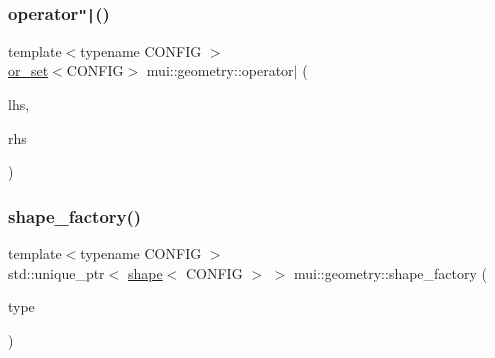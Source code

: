 \mbox{\label{namespacemui_1_1geometry_aa280a571c409841cd8e7ecb1774fd266}} 
\subsubsection{\texorpdfstring{operator\texttt{"|}()}{operator|()}}
{\footnotesize\ttfamily template$<$typename C\+O\+N\+F\+IG $>$ \\
\hyperlink{classmui_1_1geometry_1_1or__set}{or\+\_\+set}$<$C\+O\+N\+F\+IG$>$ mui\+::geometry\+::operator$\vert$ (\begin{DoxyParamCaption}\item[{\hyperlink{classmui_1_1geometry_1_1any__shape}{any\+\_\+shape}$<$ C\+O\+N\+F\+IG $>$}]{lhs,  }\item[{\hyperlink{classmui_1_1geometry_1_1any__shape}{any\+\_\+shape}$<$ C\+O\+N\+F\+IG $>$}]{rhs }\end{DoxyParamCaption})}

\mbox{\label{namespacemui_1_1geometry_a48a53be187267ec9912fafc182651a6e}} 
\subsubsection{\texorpdfstring{shape\+\_\+factory()}{shape\_factory()}}
{\footnotesize\ttfamily template$<$typename C\+O\+N\+F\+IG $>$ \\
std\+::unique\+\_\+ptr$<$ \hyperlink{classmui_1_1geometry_1_1shape}{shape}$<$ C\+O\+N\+F\+IG $>$ $>$ mui\+::geometry\+::shape\+\_\+factory (\begin{DoxyParamCaption}\item[{\hyperlink{namespacemui_1_1geometry_a5f311a343181e2f20482e5c9afb0f136}{shape\+\_\+type}}]{type }\end{DoxyParamCaption})}

